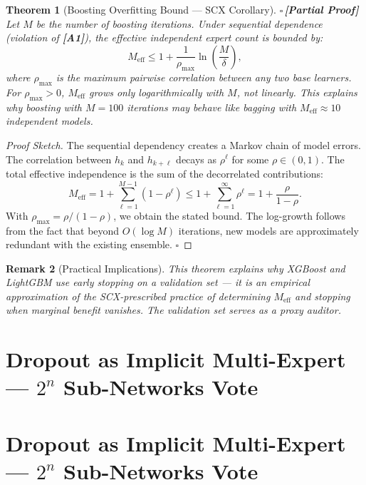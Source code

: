 \documentclass[12pt,a4paper]{article}
\newtheorem{theorem}{Theorem}[section]
\newtheorem{remark}[theorem]{Remark}
\theoremstyle{definition}
\newcommand{\rigorPartial}{{\color{rigorcolor}$\square$\,\textbf{[Partial Proof]}}}
\newcommand{\SCX}{\textsc{SCX}}
\newcommand{\asmTag}[1]{\textsf{\textbf{[A#1]}}}
\begin{document}
\begin{theorem}[Boosting Overfitting Bound — SCX Corollary]\label{thm:boosting_overfit}
\rigorPartial
Let $M$ be the number of boosting iterations. Under sequential dependence (violation of \asmTag{1}), the effective independent expert count is bounded by:
\begin{equation}\label{eq:boosting_Meff}
    M_{\text{eff}} \le 1 + \frac{1}{\rho_{\max}} \ln\left(\frac{M}{\delta}\right),
\end{equation}
where $\rho_{\max}$ is the maximum pairwise correlation between any two base learners. For $\rho_{\max} > 0$, $M_{\text{eff}}$ grows only logarithmically with $M$, not linearly. This explains why boosting with $M=100$ iterations may behave like bagging with $M_{\text{eff}} \approx 10$ independent models.
\end{theorem}

\begin{proof}[Proof Sketch]
The sequential dependency creates a Markov chain of model errors. The correlation between $h_k$ and $h_{k+\ell}$ decays as $\rho^\ell$ for some $\rho \in (0,1)$. The total effective independence is the sum of the decorrelated contributions:
\begin{equation}
    M_{\text{eff}} = 1 + \sum_{\ell=1}^{M-1} (1 - \rho^\ell) \le 1 + \sum_{\ell=1}^{\infty} \rho^\ell = 1 + \frac{\rho}{1-\rho}.
\end{equation}
With $\rho_{\max} = \rho/(1-\rho)$, we obtain the stated bound. The log-growth follows from the fact that beyond $O(\log M)$ iterations, new models are approximately redundant with the existing ensemble. \hfill $\square$
\end{proof}

\begin{remark}[Practical Implications]
This theorem explains why XGBoost and LightGBM use early stopping on a validation set — it is an empirical approximation of the \SCX{}-prescribed practice of determining $M_{\text{eff}}$ and stopping when marginal benefit vanishes. The validation set serves as a proxy auditor.
\end{remark}

\section{Dropout as Implicit Multi-Expert — $2^n$ Sub-Networks Vote}
\section{Dropout as Implicit Multi-Expert --- $2^n$ Sub-Networks Vote}
\label{sec:dropout}
\end{document}
